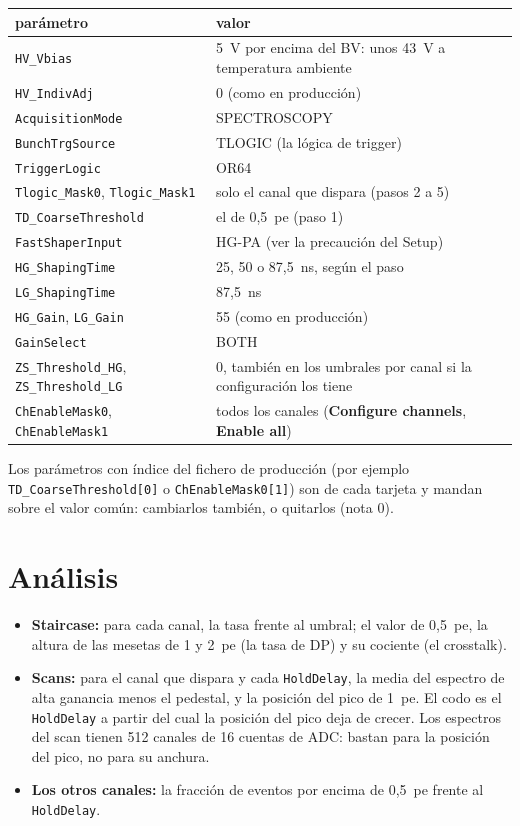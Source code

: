 \documentclass[11pt,a4paper]{article}
\begin{document}
\begin{center}
\small
\begin{tabular}{p{} p{}}
\hline
parámetro & valor \\
\hline
\texttt{HV\_Vbias} & 5~V por encima del BV: unos 43~V a temperatura
ambiente \\
\texttt{HV\_IndivAdj} & 0 (como en producción) \\
\texttt{AcquisitionMode} & SPECTROSCOPY \\
\texttt{BunchTrgSource} & TLOGIC (la lógica de trigger) \\
\texttt{TriggerLogic} & OR64 \\
\texttt{Tlogic\_Mask0}, \texttt{Tlogic\_Mask1} & solo el canal que dispara
(pasos 2 a 5) \\
\texttt{TD\_CoarseThreshold} & el de 0,5~pe (paso 1) \\
\texttt{FastShaperInput} & HG-PA (ver la precaución del Setup) \\
\texttt{HG\_ShapingTime} & 25, 50 o 87,5~ns, según el paso \\
\texttt{LG\_ShapingTime} & 87,5~ns \\
\texttt{HG\_Gain}, \texttt{LG\_Gain} & 55 (como en producción) \\
\texttt{GainSelect} & BOTH \\
\texttt{ZS\_Threshold\_HG}, \texttt{ZS\_Threshold\_LG} & 0, también en los
umbrales por canal si la configuración los tiene \\
\texttt{ChEnableMask0}, \texttt{ChEnableMask1} & todos los canales
({\bf Configure channels}, {\bf Enable all}) \\
\hline
\end{tabular}
\end{center}

\noindent Los parámetros con índice del fichero de producción (por ejemplo
\texttt{TD\_CoarseThreshold[0]} o \texttt{ChEnableMask0[1]}) son de cada
tarjeta y mandan sobre el valor común: cambiarlos también, o quitarlos
(nota 0).

\section{Análisis}
\label{sec:datos}

\begin{itemize}
\item {\bf Staircase:} para cada canal, la tasa frente al umbral; el valor
  de 0,5~pe, la altura de las mesetas de 1 y 2~pe (la tasa de DP) y su
  cociente (el crosstalk).
\item {\bf Scans:} para el canal que dispara y cada \texttt{HoldDelay}, la
  media del espectro de alta ganancia menos el pedestal, y la posición del
  pico de 1~pe. El codo es el \texttt{HoldDelay} a partir del cual la
  posición del pico deja de crecer. Los espectros del scan tienen 512
  canales de 16 cuentas de ADC: bastan para la posición del pico, no para
  su anchura.
\item {\bf Los otros canales:} la fracción de eventos por encima de 0,5~pe
  frente al \texttt{HoldDelay}.
\end{itemize}
\end{document}

